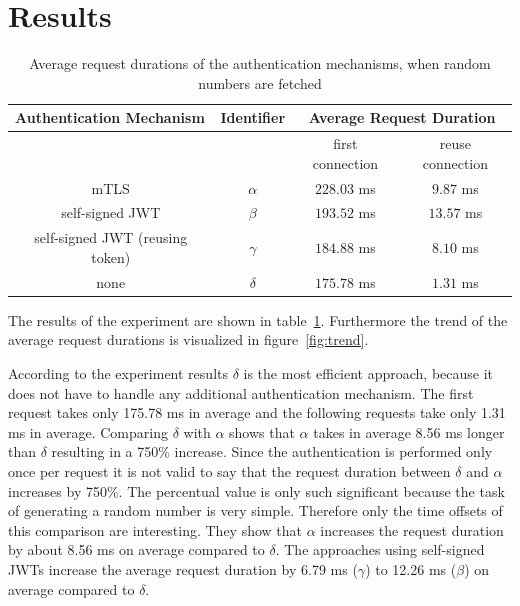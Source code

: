 \section{Results}

\begin{table}[H]
	\centering
\begin{tabular}{c|c|cc}
	\multicolumn{1}{l|}{\textbf{Authentication Mechanism}} & \textbf{Identifier} & \multicolumn{2}{c}{\textbf{Average Request Duration}} \\ \hline
	\multicolumn{1}{c|}{} & & \multicolumn{1}{c|}{first connection} & reuse connection \\ \hline
	mTLS & $\alpha$ & \multicolumn{1}{c|}{$228.03$ ms} & $9.87$ ms \\ \hline
	self-signed JWT & $\beta$ & \multicolumn{1}{c|}{$193.52$ ms} & $13.57$ ms \\ \hline
	self-signed JWT (reusing token) & $\gamma$ & \multicolumn{1}{c|}{$184.88$ ms} & $8.10$ ms \\ \hline 
	none & $\delta$ & \multicolumn{1}{c|}{$175.78$ ms} & $1.31$ ms
\end{tabular}
\caption{Average request durations of the authentication mechanisms, when random numbers are fetched}
\label{tab:experiment_case_1}
\end{table}

The results of the experiment are shown in table~\ref{tab:experiment_case_1}.
Furthermore the trend of the average request durations is visualized in figure~\ref{fig:trend}.

According to the experiment results $\delta$ is the most efficient approach, because it does not have to handle any additional authentication mechanism.
The first request takes only 175.78 ms in average and the following requests take only 1.31 ms in average.
Comparing $\delta$ with $\alpha$ shows that $\alpha$ takes in average 8.56 ms longer than $\delta$ resulting in a 750\% increase.
Since the authentication is performed only once per request it is not valid to say that the request duration between $\delta$ and $\alpha$ increases by 750\%.
The percentual value is only such significant because the task of generating a random number is very simple.
Therefore only the time offsets of this comparison are interesting.
They show that $\alpha$ increases the request duration by about 8.56 ms on average compared to $\delta$.
The approaches using self-signed JWTs increase the average request duration by 6.79 ms ($\gamma$) to 12.26 ms ($\beta$) on average compared to $\delta$. 

